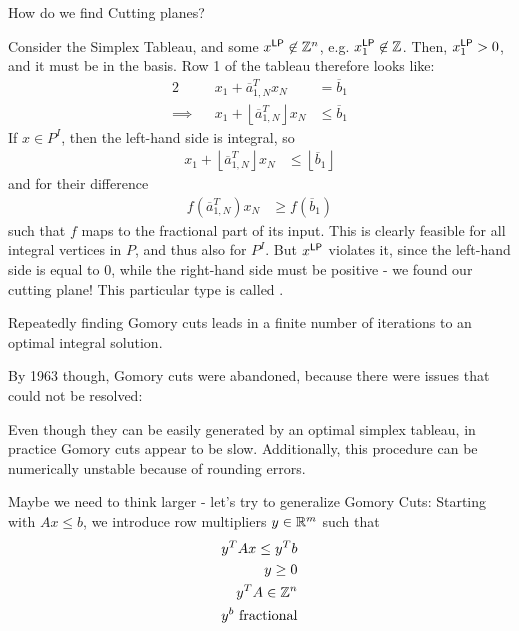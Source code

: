 \begin{question}
    How do we find Cutting planes?
\end{question}
Consider the Simplex Tableau, and some $x^{\mathsf{LP}} \not \in \mathbb{Z}^n$,
e.g. $x_1^{\mathsf{LP}} \not \in \mathbb{Z}$. Then, $x_1^{\mathsf{LP}} > 0$, and it must be in the basis.
Row 1 of the tableau therefore looks like:
\begin{alignat*}{2}
             &  & x_1 + \overline a_{1,N}^Tx_N                           & = \overline{b}_1    \\
    \implies &  & x_1 + \left\lfloor\overline a_{1,N}^T\right\rfloor x_N & \leq \overline{b}_1
\end{alignat*}
If $x \in P^I$, then the left-hand side is integral, so
\begin{align*}
    x_1 + \left\lfloor\overline a_{1,N}^T\right\rfloor x_N & \leq \left\lfloor\overline{b}_1 \right\rfloor
\end{align*}
and for their difference
\begin{align*}
    f(\overline a_{1,N}^T) x_N & \geq f(\overline{b}_1)
\end{align*}
such that $f$ maps to the fractional part of its input.
This is clearly feasible for all integral vertices in $P$, and thus also for $P^I$.
But $x^{\mathsf{LP}}$ violates it, since the left-hand side is equal to 0, while the right-hand side must be positive -
we found our cutting plane! This particular type is called .
\begin{fact}
    Repeatedly finding Gomory cuts leads in a finite number of iterations to an optimal integral solution.
\end{fact}
By 1963 though, Gomory cuts were abandoned, because there were issues that could not be resolved:
\begin{remark}
    Even though they can be easily generated by an optimal simplex tableau, in practice Gomory cuts appear to be slow.
    Additionally, this procedure can be numerically unstable because of rounding errors.
\end{remark}
Maybe we need to think larger - let's try to generalize Gomory Cuts:
Starting with $Ax \leq b$, we introduce row multipliers $y \in \mathbb{R}^m$ such that
\begin{align*}
    y^TAx \leq y^Tb      \\
    y \geq 0             \\
    y^TA \in \mathbb{Z}^n \\
    y^b \text{ fractional}
\end{align*}
